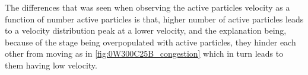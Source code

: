 The differences that was seen when observing the active particles velocity as a function of number active particles is that, 
higher number of active particles leads to a velocity distribution peak at a lower velocity, 
and the explanation being, because of the stage being overpopulated with active particles, they hinder each other from moving 
as in \cref{fig:0W300C25B_congestion} which in turn leads to them having low velocity.








